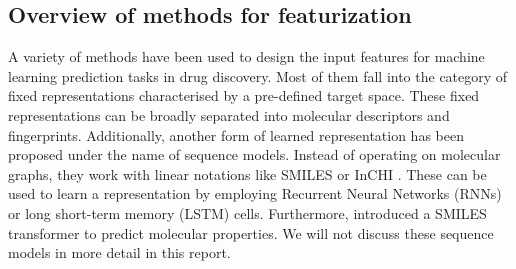 \subsection{Overview of methods for featurization}
A variety of methods have been used to design the input features for machine learning prediction tasks in drug discovery. Most of them fall into the category of fixed representations characterised by a pre-defined target space. These fixed representations can be broadly separated into molecular descriptors and fingerprints. Additionally, another form of learned representation has been proposed under the name of sequence models. Instead of operating on molecular graphs, they work with linear notations like SMILES \citep{smiles} or InCHI \citep{heller2015inchi}. These can be used to learn a representation by employing Recurrent Neural Networks (RNNs) or long short-term memory (LSTM) cells. Furthermore, \cite{honda} introduced a SMILES transformer to predict molecular properties. We will not discuss these sequence models in more detail in this report.
\label{sec:fixed_rep}


